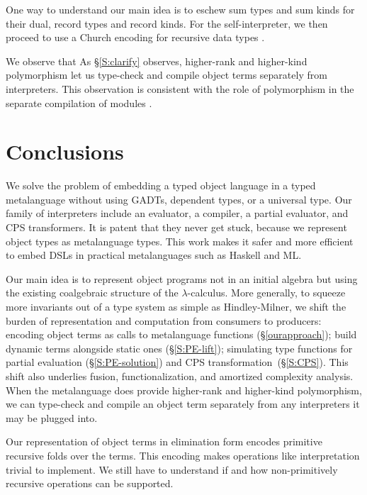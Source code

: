 \ifshort\else
One way to understand our main idea is to eschew sum types and sum kinds
for their dual, record types and record kinds.
For the self\hyp interpreter, we then proceed to use a Church encoding for
recursive data types \cite{bohm-automatic}.
\fi

\ifshort We observe that \else As \S\ref{S:clarify} observes, \fi
higher-rank and higher-kind
polymorphism let us type-check and compile object terms separately from
interpreters.  This \ifshort\else observation \fi is consistent with the role of
polymorphism in the separate compilation of modules
\cite{shao-typed}.

\begin{comment}
Our solution could have been even more straightforward if we had
total type-level functions at our disposal (|repr_pe| in
\S\ref{S:PE-solution}) in MetaOCaml.  Simple type-level computations 
certainly ought to become mainstream.
\end{comment}

\section{Conclusions}\label{conclusion}

We solve the problem of embedding a typed object language in a typed
metalanguage without using GADTs, dependent types, or a universal type.
Our family of interpreters include an evaluator, a compiler, a partial
evaluator, and CPS transformers.  It is patent that they never get stuck,
because we represent object types as metalanguage types.  This work
makes it safer and more efficient to embed DSLs
in practical metalanguages such as Haskell and ML\@.

Our main idea is to represent object programs not in an initial algebra
but using the existing coalgebraic structure of the $\lambda$-calculus.
More generally, to squeeze more invariants out of a type system as
simple as Hindley-Milner, we shift the burden of representation and
computation from consumers to producers: encoding object terms as calls
to metalanguage functions (\S\ref{ourapproach}); build dynamic terms
alongside static ones (\S\ref{S:PE-lift}); simulating type functions for
partial evaluation (\S\ref{S:PE-solution}) and CPS
transformation\ifshort\else~(\S\ref{S:CPS})\fi.
This shift also underlies fusion,
functionalization, and amortized complexity analysis.
\ifshort\else
When the metalanguage does provide higher-rank and higher-kind
polymorphism, we can type-check and compile an object term separately
from any interpreters it may be plugged into.
\fi

Our representation of object terms in elimination form encodes
primitive recursive folds over the terms. 
\ifshort\else
This encoding makes operations like interpretation trivial to implement.
\fi
We still
have to understand if and how non-primitively 
recursive operations can be supported.


